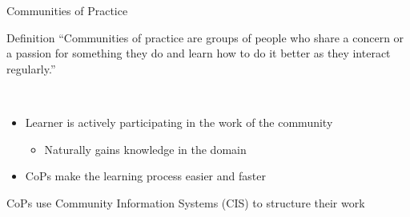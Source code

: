 \begin{frame}{Communities of Practice}
  \begin{block}{Definition}
    ``Communities of practice are groups of people who share a concern or a
    passion for something they do and learn how to do it better as they interact regularly.'' \cite{Weng98}
  \end{block}
  \ \\
  \begin{itemize}
    \item Learner is actively participating in the work of the community
    \begin{itemize}
        \item Naturally gains knowledge in the domain
    \end{itemize}
    \item CoPs make the learning process easier and faster \cite{CuZe05}
    
  \end{itemize}

   CoPs use Community Information Systems (CIS) to structure their work
\end{frame}


